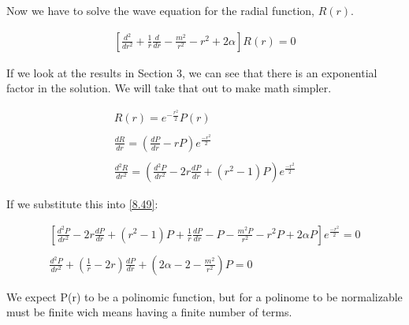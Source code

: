 Now we have to solve the wave equation for the radial function, $R(r)$.

\begin{equation}
  \label{8.49}
  \begin{array}{c}
    \left[\frac{d^2}{dr^2}+\frac{1}{r}\frac{d}{dr}-\frac{m^2}{r^2}-r^2+2\alpha\right]R(r) = 0
  \end{array}
\end{equation}

If we look at the results in Section 3, we can see that there is an exponential factor in the solution. We will take that out to make math simpler.

\begin{equation}
  \begin{array}{c}
    R(r) = e^{-\frac{r^2}{2}} P(r)
    \\

    \\
    \frac{dR}{dr} = \left(\frac{dP}{dr}-rP \right)e^{\frac{-r^2}{2}}
    \\

    \\
    \frac{d^2R}{dr^2} = \left(\frac{d^2P}{dr^2}-2r\frac{dP}{dr}+(r^2-1)P \right)e^{\frac{-r^2}{2}}
  \end{array}
\end{equation}

If we substitute this into \ref{8.49}:

\begin{equation}
  \begin{array}{c}
    \left[\frac{d^2P}{dr^2}- 2r\frac{dP}{dr} + (r^2-1)P +\frac{1}{r}\frac{dP}{dr}-P-\frac{m^2P}{r^2}-r^2P+2\alpha P\right]e^{\frac{-r^2}{2}} = 0
    \\

    \\
    \frac{d^2P}{dr^2} + \left(\frac{1}{r}-2r\right)\frac{dP}{dr}+\left(2\alpha-2-\frac{m^2}{r^2}\right)P = 0
  \end{array}
\end{equation}

We expect P(r) to be a polinomic function, but for a polinome to be normalizable must be finite wich means having a finite number of terms.










